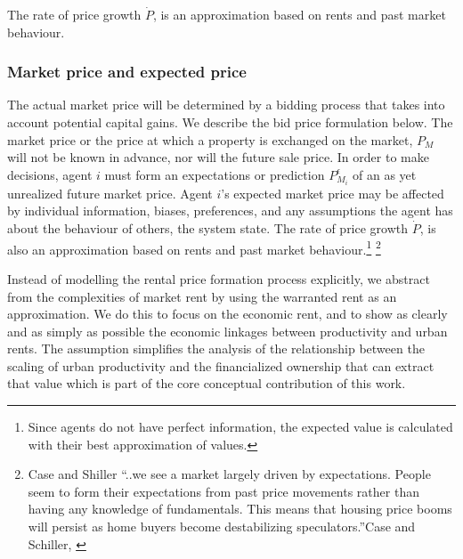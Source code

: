 The rate of price growth $\dot P$, is an approximation based on rents and past market behaviour.

\subsubsection{Market price and expected price}\label{sssec-market-price}

The actual market price will be determined by a bidding process that takes into account potential capital gains.  We describe the bid price formulation below. The \gls{market price} or the price at which a property is exchanged on the market, $P_M$ will not be known in advance, nor will the future sale price. In order to make decisions, agent $i$ must form an  \glspl{expectation} or   prediction $P_{M_i}^{\epsilon}$ of an as yet unrealized future market price. Agent $i$'s expected market price  may be affected by individual information, biases, preferences, and any assumptions the agent has about the behaviour of others, the system state. The rate of price growth $\dot P$, is also an approximation based on rents and past market behaviour.\footnote{Since  agents do not have perfect information, the expected value  is calculated with their best approximation of values.} 
 \footnote{Case and Shiller ``..we see a market largely driven by expectations. People seem to form their expectations from past price movements rather than having any knowledge of fundamentals. This means that housing price booms will persist as home buyers become destabilizing speculators.''Case and Schiller, \cite{caseThereBubbleHousing2003}} 






Instead of modelling the rental price formation process explicitly, we abstract from the complexities  of market rent  by using the warranted rent as an approximation. We do this to focus on the economic rent, and to show as clearly and as simply as possible the economic linkages between productivity and urban rents. 
The assumption simplifies the analysis of the relationship between the scaling of urban productivity and the financialized ownership that can extract that value which is part of  the core conceptual contribution of this work. 


